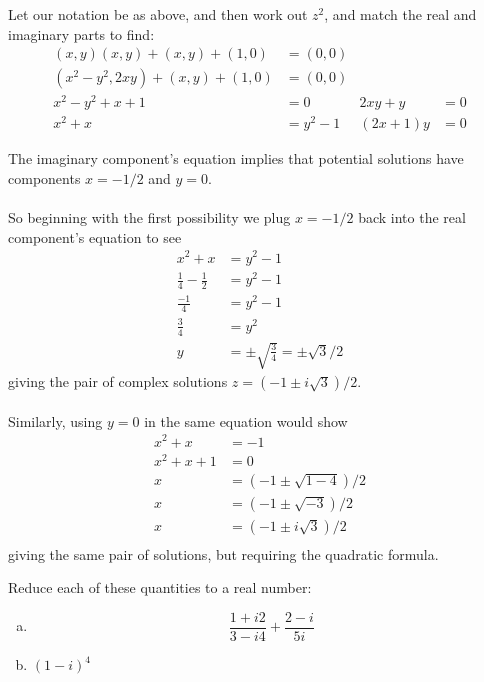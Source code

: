 \documentclass{article}
\begin{document}
\begin{solution}
Let our notation be as above, and then work out $z^{2}$, and match the real and imaginary parts to find:
\begin{align*}
(x,y)(x,y) + (x,y) + (1,0) &= (0,0)\\
(x^{2}-y^{2},2xy) + (x,y) + (1,0) &= (0,0)\\
x^{2}-y^{2} + x + 1 &= 0	&	2xy + y &= 0\\
x^{2}+x &= y^{2}-1	&	(2x+1)y &= 0
\end{align*}

The imaginary component's equation implies that potential solutions have components $x=-1/2$ and $y=0$.

\paragraph{}
So beginning with the first possibility we plug $x=-1/2$ back into the real component's equation to see
\begin{align*}
x^{2}+x &= y^{2}-1 \\
\frac{1}{4}-\frac{1}{2} &= y^{2}-1 \\
\frac{-1}{4} &= y^{2}-1 \\
\frac{3}{4} &= y^{2} \\
y &= \pm\sqrt{\frac{3}{4}} = \pm\sqrt{3}/2
\end{align*}
giving the pair of complex solutions $z=\left(-1\pm i\sqrt{3}\right)/2$.

\paragraph{}
Similarly, using $y=0$ in the same equation would show
\begin{align*}
x^{2}+x &= -1 \\
x^{2}+x+1 &= 0 \\
x &= \left( -1 \pm \sqrt{1-4} \right)/2 \\
x &= \left( -1 \pm \sqrt{-3} \right)/2 \\
x &= \left( -1 \pm i\sqrt{3} \right)/2 \\
\end{align*}
giving the same pair of solutions, but requiring the quadratic formula.
\end{solution}

\begin{problem}
Reduce each of these quantities to a real number:
\begin{enumerate}[(a)]
\item 
\[ \frac{1+i2}{3-i4} + \frac{2-i}{5i} \]
\item $(1-i)^{4}$
\end{enumerate}
\end{problem}
\end{document}
